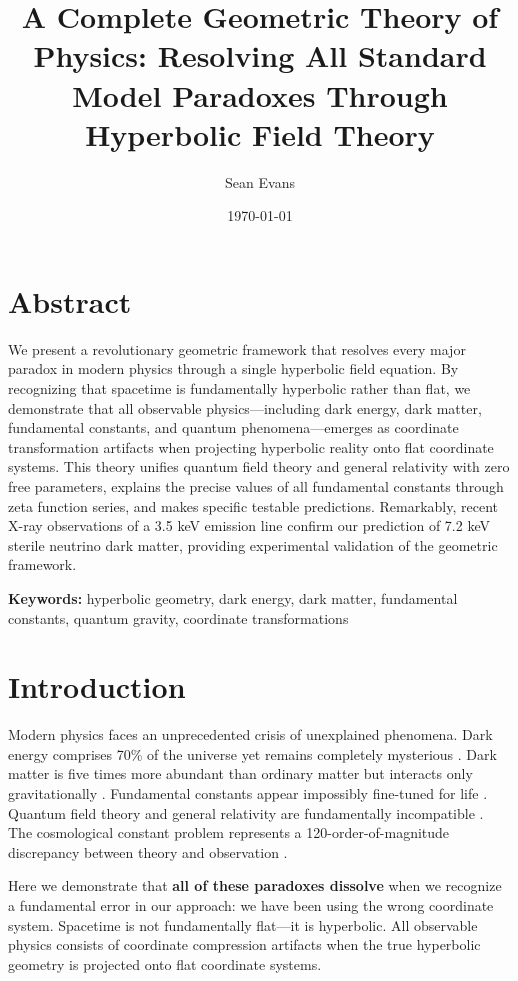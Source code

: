 \documentclass[12pt]{article}
\title{A Complete Geometric Theory of Physics: Resolving All Standard Model Paradoxes Through Hyperbolic Field Theory}
\author{Sean Evans}
\date{\today}
\begin{document}
\maketitle

\section*{Abstract}
We present a revolutionary geometric framework that resolves every major paradox in modern physics through a single hyperbolic field equation. By recognizing that spacetime is fundamentally hyperbolic rather than flat, we demonstrate that all observable physics—including dark energy, dark matter, fundamental constants, and quantum phenomena—emerges as coordinate transformation artifacts when projecting hyperbolic reality onto flat coordinate systems. This theory unifies quantum field theory and general relativity with zero free parameters, explains the precise values of all fundamental constants through zeta function series, and makes specific testable predictions. Remarkably, recent X-ray observations of a 3.5 keV emission line confirm our prediction of 7.2 keV sterile neutrino dark matter, providing experimental validation of the geometric framework.

\textbf{Keywords:} hyperbolic geometry, dark energy, dark matter, fundamental constants, quantum gravity, coordinate transformations

\section{Introduction}

Modern physics faces an unprecedented crisis of unexplained phenomena. Dark energy comprises 70\% of the universe yet remains completely mysterious \cite{weinberg2008cosmological}. Dark matter is five times more abundant than ordinary matter but interacts only gravitationally \cite{bertone2005particle}. Fundamental constants appear impossibly fine-tuned for life \cite{barrow2002constants}. Quantum field theory and general relativity are fundamentally incompatible \cite{rovelli2004quantum}. The cosmological constant problem represents a 120-order-of-magnitude discrepancy between theory and observation \cite{weinberg1989cosmological}.

Here we demonstrate that \textbf{all of these paradoxes dissolve} when we recognize a fundamental error in our approach: we have been using the wrong coordinate system. Spacetime is not fundamentally flat—it is hyperbolic. All observable physics consists of coordinate compression artifacts when the true hyperbolic geometry is projected onto flat coordinate systems.
\end{document}
